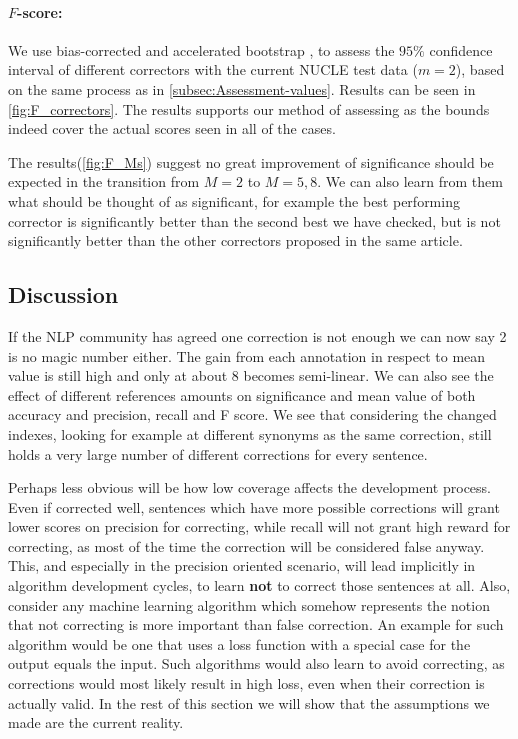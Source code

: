 \documentclass[letter,11pt]{article}
\begin{document}
\paragraph{$F$-score:} We use bias-corrected and accelerated bootstrap \cite{efron1987better}, to assess the $95\%$ confidence interval of different correctors with the current NUCLE test data ($m=2$), based on the same process as in \ref{subsec:Assessment-values}. Results can be seen in \ref{fig:F_correctors}. The results supports our method of assessing as the bounds indeed cover the actual scores seen in all of the cases.

The results(\ref{fig:F_Ms}) suggest no great improvement of significance should be expected in the transition from $M=2$ to $M=5,8$. We can also learn from them what should be thought of as significant, for example the best performing corrector is significantly better than the second best we have checked, but is not significantly better than the other correctors proposed in the same article\cite{rozovskaya2016grammatical}.

\subsection{Discussion}

If the NLP community has agreed one correction is not enough\cite{tetreault2008native}
we can now say 2 is no magic number either. The gain from each annotation in respect to mean value is still high and only at about 8 becomes semi-linear. We can also see the effect of different references amounts on significance and mean value of both accuracy and precision, recall and F score.
We see that considering the changed indexes, looking for example at different synonyms as the same correction, still holds a very large number of different corrections for every sentence.

Perhaps less obvious will be how low coverage affects the development
process. Even if corrected well, sentences which have more possible
corrections will grant lower scores on precision for correcting, while recall will not grant high reward for correcting, as most of the time the correction will be considered false anyway. This, and especially in the precision oriented scenario, will lead implicitly in algorithm development cycles, to learn \textbf{not} to correct those sentences at all. Also, consider any machine learning algorithm which somehow represents the notion that not correcting is more important than false correction. An example for such algorithm would be one that uses a loss function with a special case for the output equals the input. Such algorithms would also learn to avoid correcting, as corrections would most likely result in high loss, even when their correction is actually valid.
In the rest of this section we will show that the assumptions we made are the current reality. 
\end{document}

